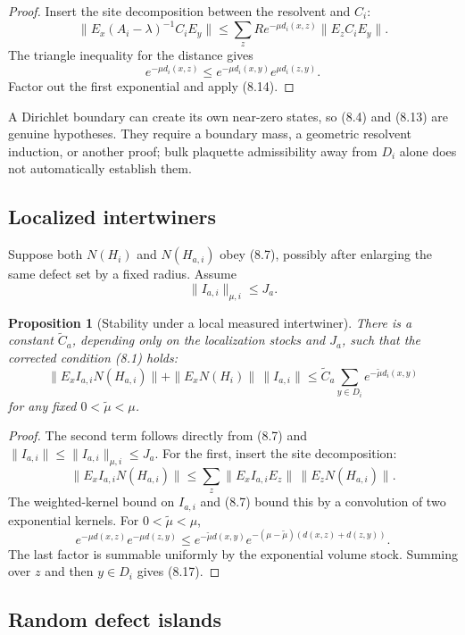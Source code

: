 \documentclass[11pt]{article}
\newtheorem{proposition}[theorem]{Proposition}
\begin{document}
\begin{proof}
Insert the site decomposition between the resolvent and \(C_i\):
\[
 \|E_x(A_i-\lambda)^{-1}C_iE_y\|
 \leq
 \sum_z
 R e^{-\mu d_i(x,z)}\|E_zC_iE_y\|.
\]
The triangle inequality for the distance gives
\[
 e^{-\mu d_i(x,z)}
 \leq
 e^{-\mu d_i(x,y)}e^{\mu d_i(z,y)}.
\]
Factor out the first exponential and apply (8.14).
\end{proof}

A Dirichlet boundary can create its own near-zero states, so (8.4) and
(8.13) are genuine hypotheses.  They require a boundary mass, a geometric
resolvent induction, or another proof; bulk plaquette admissibility away
from \(D_i\) alone does not automatically establish them.

\subsection{Localized intertwiners}

Suppose both \(N(H_i)\) and \(N(H_{a,i})\) obey (8.7), possibly after
enlarging the same defect set by a fixed radius.  Assume
\[
 \|I_{a,i}\|_{\mu,i}\leq J_a.
 \tag{8.16}
\]

\begin{proposition}[Stability under a local measured intertwiner]
\label{prop:v11v8-intertwiner}
There is a constant \(\widetilde C_a\), depending only on the localization
stocks and \(J_a\), such that the corrected condition (8.1) holds:
\[
 \|E_xI_{a,i}N(H_{a,i})\|
 +
 \|E_xN(H_i)\|\,\|I_{a,i}\|
 \leq
 \widetilde C_a
 \sum_{y\in D_i}e^{-\widetilde\mu d_i(x,y)}
 \tag{8.17}
\]
for any fixed \(0<\widetilde\mu<\mu\).
\end{proposition}

\begin{proof}
The second term follows directly from (8.7) and
\(\|I_{a,i}\|\leq\|I_{a,i}\|_{\mu,i}\leq J_a\).
For the first, insert the site decomposition:
\[
 \|E_xI_{a,i}N(H_{a,i})\|
 \leq
 \sum_z\|E_xI_{a,i}E_z\|\,\|E_zN(H_{a,i})\|.
\]
The weighted-kernel bound on \(I_{a,i}\) and (8.7) bound this by a
convolution of two exponential kernels.  For
\(0<\widetilde\mu<\mu\),
\[
 e^{-\mu d(x,z)}e^{-\mu d(z,y)}
 \leq
 e^{-\widetilde\mu d(x,y)}
 e^{-(\mu-\widetilde\mu)(d(x,z)+d(z,y))}.
\]
The last factor is summable uniformly by the exponential volume stock.
Summing over \(z\) and then \(y\in D_i\) gives (8.17).
\end{proof}

\subsection{Random defect islands}
\end{document}
